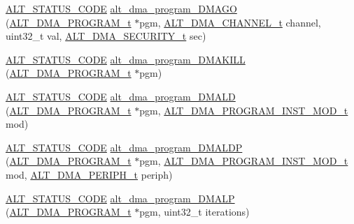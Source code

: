\begin{DoxyCompactItemize}
\item 
\mbox{\hyperlink{hwlib_8h_abdb0d369f069723ca55d6c94bcaaaa12}{A\+L\+T\+\_\+\+S\+T\+A\+T\+U\+S\+\_\+\+C\+O\+DE}} \mbox{\hyperlink{group__ALT__DMA__PRG_ga2497990754e2f854a62f2319b08477cc}{alt\+\_\+dma\+\_\+program\+\_\+\+D\+M\+A\+GO}} (\mbox{\hyperlink{group__ALT__DMA__PRG_gadb7028531574894854db4db6d797de97}{A\+L\+T\+\_\+\+D\+M\+A\+\_\+\+P\+R\+O\+G\+R\+A\+M\+\_\+t}} $\ast$pgm, \mbox{\hyperlink{group__ALT__DMA__COMMON_ga959232e3b00ce45a3049183cce4c9d59}{A\+L\+T\+\_\+\+D\+M\+A\+\_\+\+C\+H\+A\+N\+N\+E\+L\+\_\+t}} channel, uint32\+\_\+t val, \mbox{\hyperlink{group__ALT__DMA__COMMON_ga59d720d9a72123eca037cc48a734fd7c}{A\+L\+T\+\_\+\+D\+M\+A\+\_\+\+S\+E\+C\+U\+R\+I\+T\+Y\+\_\+t}} sec)
\item 
\mbox{\hyperlink{hwlib_8h_abdb0d369f069723ca55d6c94bcaaaa12}{A\+L\+T\+\_\+\+S\+T\+A\+T\+U\+S\+\_\+\+C\+O\+DE}} \mbox{\hyperlink{group__ALT__DMA__PRG_ga49db9b693ba61e49cb8b168d6e929553}{alt\+\_\+dma\+\_\+program\+\_\+\+D\+M\+A\+K\+I\+LL}} (\mbox{\hyperlink{group__ALT__DMA__PRG_gadb7028531574894854db4db6d797de97}{A\+L\+T\+\_\+\+D\+M\+A\+\_\+\+P\+R\+O\+G\+R\+A\+M\+\_\+t}} $\ast$pgm)
\item 
\mbox{\hyperlink{hwlib_8h_abdb0d369f069723ca55d6c94bcaaaa12}{A\+L\+T\+\_\+\+S\+T\+A\+T\+U\+S\+\_\+\+C\+O\+DE}} \mbox{\hyperlink{group__ALT__DMA__PRG_ga53f081171931772be477d1fd623cac38}{alt\+\_\+dma\+\_\+program\+\_\+\+D\+M\+A\+LD}} (\mbox{\hyperlink{group__ALT__DMA__PRG_gadb7028531574894854db4db6d797de97}{A\+L\+T\+\_\+\+D\+M\+A\+\_\+\+P\+R\+O\+G\+R\+A\+M\+\_\+t}} $\ast$pgm, \mbox{\hyperlink{group__ALT__DMA__PRG_gaf8145a0ef11f4188f07bb0c961575d4a}{A\+L\+T\+\_\+\+D\+M\+A\+\_\+\+P\+R\+O\+G\+R\+A\+M\+\_\+\+I\+N\+S\+T\+\_\+\+M\+O\+D\+\_\+t}} mod)
\item 
\mbox{\hyperlink{hwlib_8h_abdb0d369f069723ca55d6c94bcaaaa12}{A\+L\+T\+\_\+\+S\+T\+A\+T\+U\+S\+\_\+\+C\+O\+DE}} \mbox{\hyperlink{group__ALT__DMA__PRG_ga9db886e14682ed5f4229101a50f5b60c}{alt\+\_\+dma\+\_\+program\+\_\+\+D\+M\+A\+L\+DP}} (\mbox{\hyperlink{group__ALT__DMA__PRG_gadb7028531574894854db4db6d797de97}{A\+L\+T\+\_\+\+D\+M\+A\+\_\+\+P\+R\+O\+G\+R\+A\+M\+\_\+t}} $\ast$pgm, \mbox{\hyperlink{group__ALT__DMA__PRG_gaf8145a0ef11f4188f07bb0c961575d4a}{A\+L\+T\+\_\+\+D\+M\+A\+\_\+\+P\+R\+O\+G\+R\+A\+M\+\_\+\+I\+N\+S\+T\+\_\+\+M\+O\+D\+\_\+t}} mod, \mbox{\hyperlink{group__ALT__DMA__COMMON_gae9baf8ac891f0583f9c1c61528cc1736}{A\+L\+T\+\_\+\+D\+M\+A\+\_\+\+P\+E\+R\+I\+P\+H\+\_\+t}} periph)
\item 
\mbox{\hyperlink{hwlib_8h_abdb0d369f069723ca55d6c94bcaaaa12}{A\+L\+T\+\_\+\+S\+T\+A\+T\+U\+S\+\_\+\+C\+O\+DE}} \mbox{\hyperlink{group__ALT__DMA__PRG_gaa3b096d168e102709620d9c99daa5061}{alt\+\_\+dma\+\_\+program\+\_\+\+D\+M\+A\+LP}} (\mbox{\hyperlink{group__ALT__DMA__PRG_gadb7028531574894854db4db6d797de97}{A\+L\+T\+\_\+\+D\+M\+A\+\_\+\+P\+R\+O\+G\+R\+A\+M\+\_\+t}} $\ast$pgm, uint32\+\_\+t iterations)

\end{DoxyCompactItemize}
